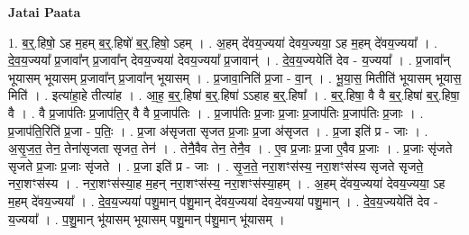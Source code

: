 \documentclass[17pt]{extarticle}
\begin{document}
\textbf{Jatai Paata} \newline

1. ब॒र्॒.हिषो॒ ऽह म॒हम् ब॒र्॒.हिषो॑ ब॒र्॒.हिषो॒ ऽहम् । . अ॒हम् दे॑वय॒ज्यया॑ देवय॒ज्यया॒ ऽह म॒हम् दे॑वय॒ज्यया᳚ । . दे॒व॒य॒ज्यया᳚ प्र॒जावा᳚न् प्र॒जावा᳚न् देवय॒ज्यया॑ देवय॒ज्यया᳚ प्र॒जावान्॑ । . दे॒व॒य॒ज्ययेति॑ देव - य॒ज्यया᳚ । . प्र॒जावा᳚न् भूयासम् भूयासम् प्र॒जावा᳚न् प्र॒जावा᳚न् भूयासम् । . प्र॒जावा॒निति॑ प्र॒जा - वा॒न् । . भू॒या॒स॒ मितीति॑ भूयासम् भूयास॒ मिति॑ । . इत्या॑हा॒हे तीत्या॑ह । . आ॒ह॒ ब॒र्॒.हिषा॑ ब॒र्॒.हिषा॑ ऽऽहाह ब॒र्॒.हिषा᳚ । . ब॒र्॒.हिषा॒ वै वै ब॒र्॒.हिषा॑ ब॒र्॒.हिषा॒ वै । . वै प्र॒जाप॑तिः प्र॒जाप॑ति॒र् वै वै प्र॒जाप॑तिः । . प्र॒जाप॑तिः प्र॒जाः प्र॒जाः प्र॒जाप॑तिः प्र॒जाप॑तिः प्र॒जाः । . प्र॒जाप॑ति॒रिति॑ प्र॒जा - प॒तिः॒ । . प्र॒जा अ॑सृजता सृजत प्र॒जाः प्र॒जा अ॑सृजत । . प्र॒जा इति॑ प्र - जाः । . अ॒सृ॒ज॒त॒ तेन॒ तेना॑सृजता सृजत॒ तेन॑ । . तेनै॒वैव तेन॒ तेनै॒व । . ए॒व प्र॒जाः प्र॒जा ए॒वैव प्र॒जाः । . प्र॒जाः सृ॑जते सृजते प्र॒जाः प्र॒जाः सृ॑जते । . प्र॒जा इति॑ प्र - जाः । . सृ॒ज॒ते॒ नरा॒शꣳस॑स्य॒ नरा॒शꣳस॑स्य सृजते सृजते॒ नरा॒शꣳस॑स्य । . नरा॒शꣳस॑स्या॒ह म॒हन् नरा॒शꣳस॑स्य॒ नरा॒शꣳस॑स्या॒हम् । . अ॒हम् दे॑वय॒ज्यया॑ देवय॒ज्यया॒ ऽह म॒हम् दे॑वय॒ज्यया᳚ । . दे॒व॒य॒ज्यया॑ पशु॒मान् प॑शु॒मान् दे॑वय॒ज्यया॑ देवय॒ज्यया॑ पशु॒मान् । . दे॒व॒य॒ज्ययेति॑ देव - य॒ज्यया᳚ । . प॒शु॒मान् भू॑यासम् भूयासम् पशु॒मान् प॑शु॒मान् भू॑यासम् । \newline
\end{document}
